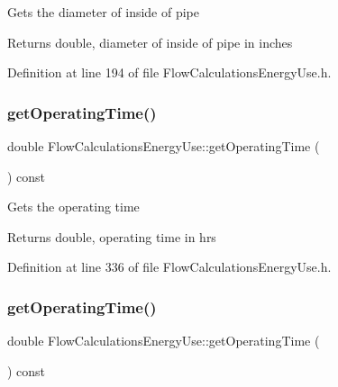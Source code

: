 Gets the diameter of inside of pipe

\begin{DoxyReturn}{Returns}
double, diameter of inside of pipe in inches 
\end{DoxyReturn}


Definition at line 194 of file Flow\+Calculations\+Energy\+Use.\+h.

\mbox{\label{class_flow_calculations_energy_use_ab44c6cad4825e30f5599f18fcbfbb873}} 
\subsubsection{\texorpdfstring{get\+Operating\+Time()}{getOperatingTime()}\hspace{0.1cm}{\footnotesize\ttfamily [1/3]}}
{\footnotesize\ttfamily double Flow\+Calculations\+Energy\+Use\+::get\+Operating\+Time (\begin{DoxyParamCaption}{ }\end{DoxyParamCaption}) const\hspace{0.3cm}{\ttfamily [inline]}}

Gets the operating time

\begin{DoxyReturn}{Returns}
double, operating time in hrs 
\end{DoxyReturn}


Definition at line 336 of file Flow\+Calculations\+Energy\+Use.\+h.

\mbox{\label{class_flow_calculations_energy_use_ab44c6cad4825e30f5599f18fcbfbb873}} 
\subsubsection{\texorpdfstring{get\+Operating\+Time()}{getOperatingTime()}\hspace{0.1cm}{\footnotesize\ttfamily [2/3]}}
{\footnotesize\ttfamily double Flow\+Calculations\+Energy\+Use\+::get\+Operating\+Time (\begin{DoxyParamCaption}{ }\end{DoxyParamCaption}) const\hspace{0.3cm}{\ttfamily [inline]}}

